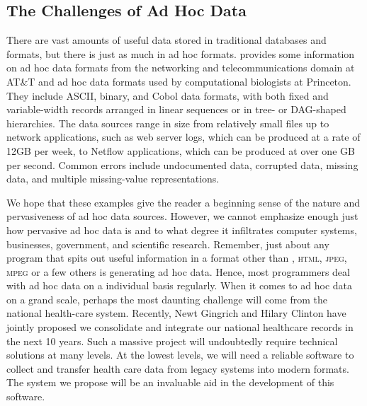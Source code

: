 \documentclass[11pt]{article}
\begin{document}
\subsection{The Challenges of Ad Hoc Data}

There are vast amounts of useful data stored in traditional databases
and \xml{} formats, but there is just as much in ad hoc formats.
 provides some information on ad hoc data
formats from the networking and telecommunications domain at AT\&T and
ad hoc data formats used by computational biologists at Princeton.
They include ASCII, binary, and Cobol data formats, with both fixed
and variable-width records arranged in linear sequences or in tree- or
DAG-shaped hierarchies.  The data sources range in size from
relatively small files up to network applications, such as web server
logs, which can be produced at a rate of 12GB per week, to Netflow
applications, which can be produced at over one GB per second.  Common
errors include undocumented data, corrupted data, missing data, and
multiple missing-value representations.

We hope that these examples give the reader a beginning sense of the
nature and pervasiveness of ad hoc data sources.  However, we cannot
emphasize enough just how pervasive ad hoc data is and to what degree
it infiltrates computer systems, businesses, government, and
scientific research.  Remember, just about any program that spits out
useful information in a format other than \xml{}, \textsc{html},
\textsc{jpeg}, \textsc{mpeg} or a few others is generating ad hoc
data.  Hence, most programmers deal with ad hoc data on a individual
basis regularly.  When it comes to ad hoc data on a grand scale,
perhaps the most daunting challenge will come from the national
health-care system.  Recently, Newt Gingrich and Hilary Clinton have
jointly proposed we consolidate and integrate our national healthcare
records in the next 10 years.  Such a massive project will undoubtedly
require technical solutions at many levels.  At the lowest levels, we
will need a reliable software to collect and transfer health care data
from legacy systems into modern formats.  The \datatype{} system we
propose will be an invaluable aid in the development of this software.
\end{document}
